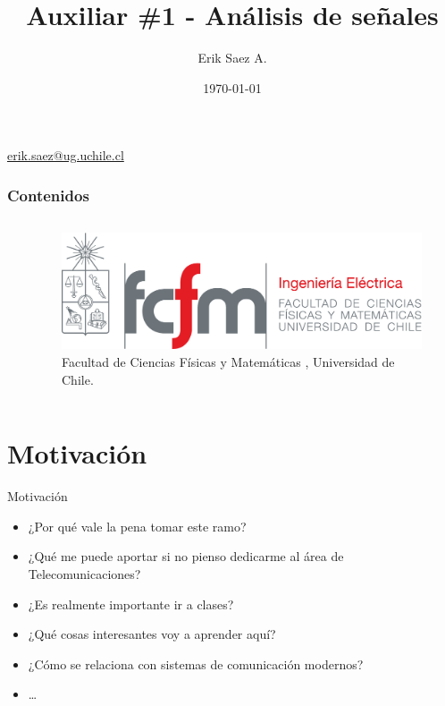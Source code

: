 \documentclass[
    10pt,
    aspectratio=169,
    xcolor={dvipsnames},
    spanish,
    ]{beamer}
\title[Auxiliar \#1 - Análisis de señales]{\bfseries Auxiliar \#1 - Análisis de señales}
\subtitle{}
\author[Erik Saez A.]{Erik Saez A.}
\institute[UChile]{Department of Electrical Engineering \\ Universidad de Chile}
\date{\today}
\begin{document}
\begin{frame}
  \titlepage
  \centering
   \href{mailto:erik.saez@ug.uchile.cl}{erik.saez@ug.uchile.cl} \hspace{.2cm}
\end{frame}

\begin{frame}
  \frametitle{Contenidos}
  \centering
  \begin{columns}
    \begin{column}{0.4\textwidth}
      \tableofcontents
    \end{column}
    \begin{column}{0.5\textwidth}
      \begin{figure}
        \centering
        \includegraphics[width=\textwidth]{fcfm_die}
        \caption{Facultad de Ciencias Físicas y Matemáticas , Universidad de Chile.}
      \end{figure}
    \end{column}
  \end{columns}  
\end{frame}

\section{Motivación}
\begin{frame}{Motivación}
  \begin{itemize}
    \item ¿Por qué vale la pena tomar este ramo?
    \item ¿Qué me puede aportar si no pienso dedicarme al área de Telecomunicaciones?
    \item ¿Es realmente importante ir a clases? 
    \item ¿Qué cosas interesantes voy a aprender aquí?
    \item ¿Cómo se relaciona con sistemas de comunicación modernos?
    \item \dots
  \end{itemize}
\end{frame}
\end{document}

